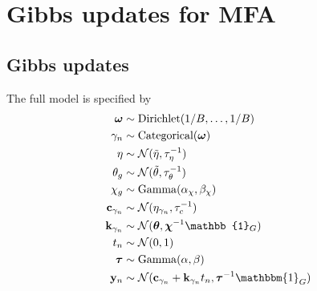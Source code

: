 \chapter{Gibbs updates for MFA} \label{app:mfa_updates}





\section{Gibbs updates}

The full model is specified by
\begin{equation} \label{eq:mfamodel}
\begin{aligned}
\bm \omega & \sim \text{Dirichlet}(1 / B, \ldots, 1 / B) \\
\gamma_n & \sim \text{Categorical}(\bm \omega) \\
\eta & \sim \norm(\tilde{\eta}, \tau_\eta^{-1}) \\
\theta_g & \sim \norm(\tilde{\theta}, \tau_\theta^{-1}) \\
\chi_g & \sim \mathrm{Gamma}(\alpha_\chi, \beta_\chi) \\
\cgi & \sim \norm(\eta_{\gamma_n}, \tau_c^{-1}) \\
\kgi & \sim \norm(\bm \theta, \bm \chi^{-1} \mathbb{1}_G) \\
t_n & \sim \norm(0, 1) \\
\btau & \sim \mathrm{Gamma}(\alpha, \beta) \\
\by_n & \sim \norm(\cgi + \kgi t_n, \btau^{-1} \mathbbm{1}_G)
\end{aligned}
\end{equation}

